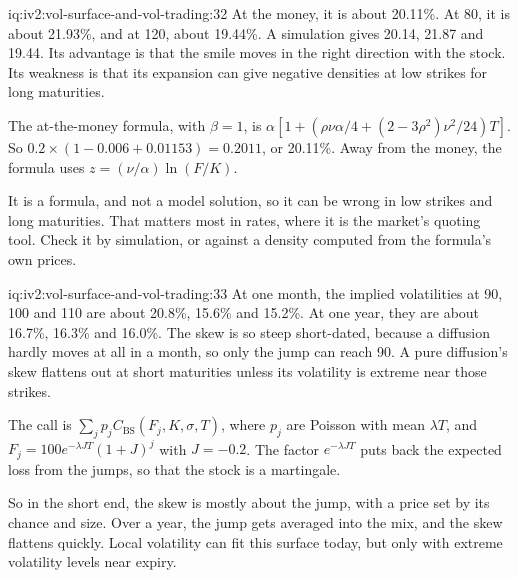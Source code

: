 \begin{solution}{iq:iv2:vol-surface-and-vol-trading:32}
At the money, it is about 20.11\%. At 80, it is about 21.93\%, and at 120, about 19.44\%. A simulation gives 20.14, 21.87 and 19.44. Its advantage is that the smile moves in the right direction with the stock. Its weakness is that its expansion can give negative densities at low strikes for long maturities.

The at-the-money formula, with $\beta = 1$, is $\alpha[1 + (\rho\nu\alpha/4 + (2 - 3\rho^2)\nu^2/24)T]$. So $0.2 \times (1 - 0.006 + 0.01153) = 0.2011$, or 20.11\%. Away from the money, the formula uses $z = (\nu/\alpha)\ln(F/K)$.

It is a formula, and not a model solution, so it can be wrong in low strikes and long maturities. That matters most in rates, where it is the market's quoting tool. Check it by simulation, or against a density computed from the formula's own prices.

\end{solution}

\begin{solution}{iq:iv2:vol-surface-and-vol-trading:33}
At one month, the implied volatilities at 90, 100 and 110 are about 20.8\%, 15.6\% and 15.2\%. At one year, they are about 16.7\%, 16.3\% and 16.0\%. The skew is so steep short-dated, because a diffusion hardly moves at all in a month, so only the jump can reach 90. A pure diffusion's skew flattens out at short maturities unless its volatility is extreme near those strikes.

The call is $\sum_jp_jC_{\text{BS}}(F_j, K, \sigma, T)$, where $p_j$ are Poisson with mean $\lambda T$, and $F_j = 100e^{-\lambda JT}(1 + J)^j$ with $J = -0.2$. The factor $e^{-\lambda JT}$ puts back the expected loss from the jumps, so that the stock is a martingale.

So in the short end, the skew is mostly about the jump, with a price set by its chance and size. Over a year, the jump gets averaged into the mix, and the skew flattens quickly. Local volatility can fit this surface today, but only with extreme volatility levels near expiry.

\end{solution}


